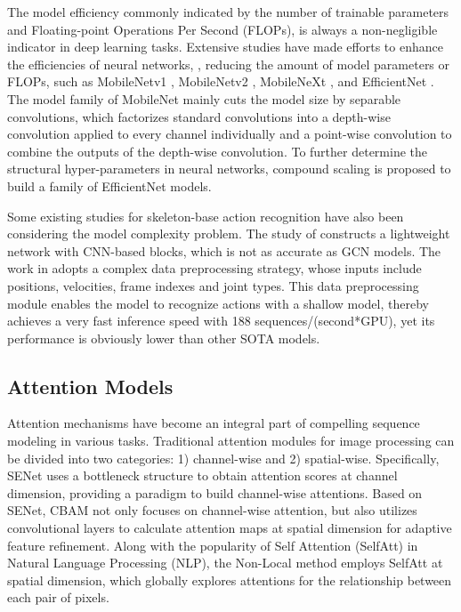 \documentclass[10pt,journal,compsoc]{IEEEtran}
\begin{document}
The model efficiency commonly indicated by the number of trainable parameters and Floating-point Operations Per Second (FLOPs), is always a non-negligible indicator in deep learning tasks. Extensive studies have made efforts to enhance the efficiencies of neural networks, \ie, reducing the amount of model parameters or FLOPs, such as MobileNetv1 \cite{howard2017mobilenets}, MobileNetv2 \cite{sandler2018mobilenetv2}, MobileNeXt \cite{zhou2020rethinking}, and EfficientNet \cite{tan2019efficientnet}. The model family of MobileNet mainly cuts the model size by separable convolutions, which factorizes standard convolutions into a depth-wise convolution applied to every channel individually and a  point-wise convolution to combine the outputs of the depth-wise convolution. To further determine the structural hyper-parameters in neural networks, compound scaling \cite{tan2019efficientnet} is proposed to build a family of EfficientNet models.

Some existing studies for skeleton-base action recognition have also been considering the model complexity problem. The study of \cite{yang2019make} constructs a lightweight network with CNN-based blocks, which is not as accurate as GCN models. The work in \cite{zhang2020semantics} adopts a complex data preprocessing strategy, whose inputs include positions, velocities, frame indexes and joint types. This data preprocessing module enables the model to recognize actions with a shallow model, thereby achieves a very fast inference speed with 188 sequences/(second*GPU), yet its performance is obviously lower than other SOTA models.

\subsection{Attention Models}
\label{ssec:related_attention}

Attention mechanisms have become an integral part of compelling sequence modeling in various tasks. Traditional attention modules for image processing can be divided into two categories: 1) channel-wise and 2) spatial-wise. Specifically, SENet \cite{hu2018squeeze} uses a bottleneck structure to obtain attention scores at channel dimension, providing a paradigm to build channel-wise attentions. Based on SENet, CBAM \cite{woo2018cbam} not only focuses on channel-wise attention, but also utilizes convolutional layers to calculate attention maps at spatial dimension for adaptive feature refinement. Along with the popularity of Self Attention (SelfAtt) in Natural Language Processing (NLP), the Non-Local \cite{wang2018non} method employs SelfAtt at spatial dimension, which globally explores attentions for the relationship between each pair of pixels.
\end{document}
